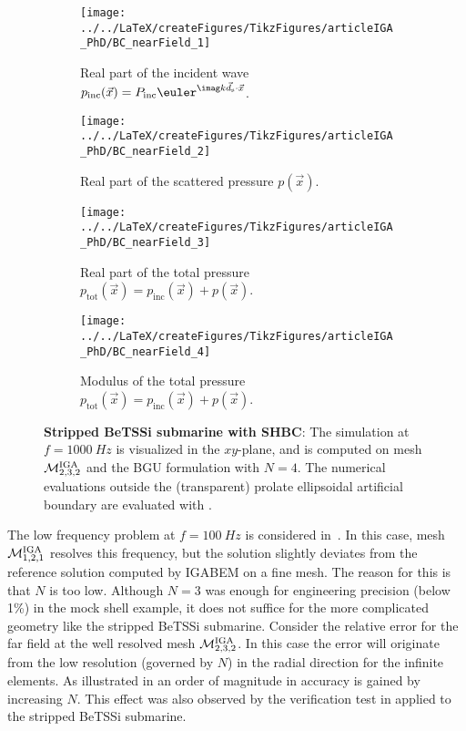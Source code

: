 \begin{figure}
	\centering    
	\begin{subfigure}[b]{\textwidth}
		\centering
		\texttt{[image: ../../LaTeX/createFigures/TikzFigures/articleIGA\_PhD/BC\_nearField\_1]}
		\caption{Real part of the incident wave $p_{\mathrm{inc}}(\vec{x})=P_{\mathrm{inc}}\euler^{\imag k\vec{d}_{\mathrm{s}}\cdot \vec{x}}$.}
	\end{subfigure}
	\par\bigskip
	\begin{subfigure}[b]{\textwidth}
		\centering
		\texttt{[image: ../../LaTeX/createFigures/TikzFigures/articleIGA\_PhD/BC\_nearField\_2]}
		\caption{Real part of the scattered pressure $p(\vec{x})$.}
	\end{subfigure}
	\par\bigskip
	\begin{subfigure}[b]{\textwidth}
		\centering
		\texttt{[image: ../../LaTeX/createFigures/TikzFigures/articleIGA\_PhD/BC\_nearField\_3]}
		\caption{Real part of the total pressure $p_{\mathrm{tot}}(\vec{x})=p_{\mathrm{inc}}(\vec{x})+p(\vec{x})$.}
	\end{subfigure}
	\par\bigskip
	\begin{subfigure}[b]{\textwidth}
		\centering
		\texttt{[image: ../../LaTeX/createFigures/TikzFigures/articleIGA\_PhD/BC\_nearField\_4]}
		\caption{Modulus of the total pressure $p_{\mathrm{tot}}(\vec{x})=p_{\mathrm{inc}}(\vec{x})+p(\vec{x})$.}
	\end{subfigure}
	\caption{\textbf{Stripped BeTSSi submarine with SHBC}: The simulation at $f=\SI{1000}{Hz}$ is visualized in the $xy$-plane, and is computed on mesh ${\cal M}_{2,3,2}^{\mathrm{IGA}}$ and the BGU formulation with $N=4$. The numerical evaluations outside the (transparent) prolate ellipsoidal artificial boundary are evaluated with .}
	\label{Fig2:BC_NearField}
\end{figure}
The low frequency problem at $f = \SI{100}{Hz}$ is considered in~. In this case, mesh ${\cal M}_{1,2,1}^{\mathrm{IGA}}$ resolves this frequency, but the solution slightly deviates from the reference solution computed by IGABEM on a fine mesh. The reason for this is that $N$ is too low. Although $N=3$ was enough for engineering precision (below 1\%) in the mock shell example, it does not suffice for the more complicated geometry like the stripped BeTSSi submarine. Consider the relative error for the far field at the well resolved mesh ${\cal M}_{2,3,2}^{\mathrm{IGA}}$. In this case the error will originate from the low resolution (governed by $N$) in the radial direction for the infinite elements. As illustrated in  an order of magnitude in accuracy is gained by increasing $N$. This effect was also observed by the verification test in  applied to the stripped BeTSSi submarine.
